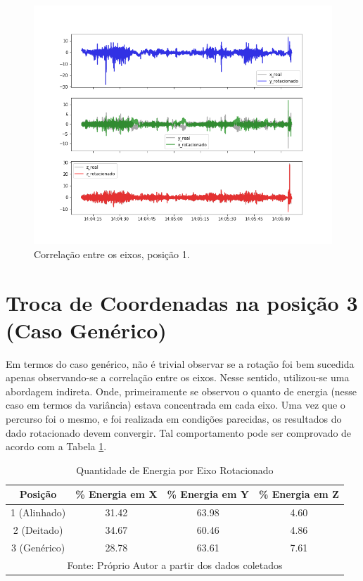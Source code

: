 \begin{figure}
    \centering
    \includegraphics[width=150mm]{Figuras/realrotacionadotrip2.png}
    \caption{Correlação entre os eixos, posição 1.}
    \label{fig:realrotacionadoTrip2}
\end{figure}{}

\section{Troca de Coordenadas na posição 3 (Caso Genérico)}
Em termos do caso genérico, não é trivial observar se a rotação foi bem sucedida apenas observando-se a correlação entre os eixos. Nesse sentido, utilizou-se uma abordagem indireta. Onde, primeiramente se observou o quanto de energia (nesse caso em termos da variância) estava concentrada em cada eixo. Uma vez que o percurso foi o mesmo, e foi realizada em condições parecidas, os resultados do dado rotacionado devem convergir. Tal comportamento pode ser comprovado de acordo com a Tabela \ref{tab:qtdEnergiaPorEixo}. 


\begin{table}[]
\caption{Quantidade de Energia por Eixo Rotacionado}
\label{tab:qtdEnergiaPorEixo}
\begin{tabular}{cccc}
\hline
\textbf{Posição} & \textbf{\% Energia em X} & \textbf{\% Energia em Y} & \textbf{\% Energia em Z} \\ \hline
1 (Alinhado) & 31.42 & 63.98 & 4.60 \\
2 (Deitado) & 34.67 & 60.46 & 4.86 \\
3 (Genérico) & 28.78 & 63.61 & 7.61 \\ \hline
\multicolumn{4}{c}{Fonte: Próprio Autor a partir dos dados coletados}
\end{tabular}
\end{table}

